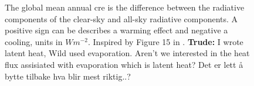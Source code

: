 \begin{figure}[ht]
    \caption{The global mean annual \acrfull{cre} is the difference between the radiative components of the clear-sky and all-sky radiative components. A positive sign can be describes a warming effect and negative a cooling, units in $W m^{-2}$. Inspired by Figure 15 in \cite{Wild2019TheModels}. \textbf{Trude:} I wrote latent heat, Wild used evaporation. Aren't we interested in the heat flux assisiated with evaporation which is latent heat? Det er lett å bytte tilbake hva blir mest riktig..?}
    \label{fig:cre}
\end{figure}